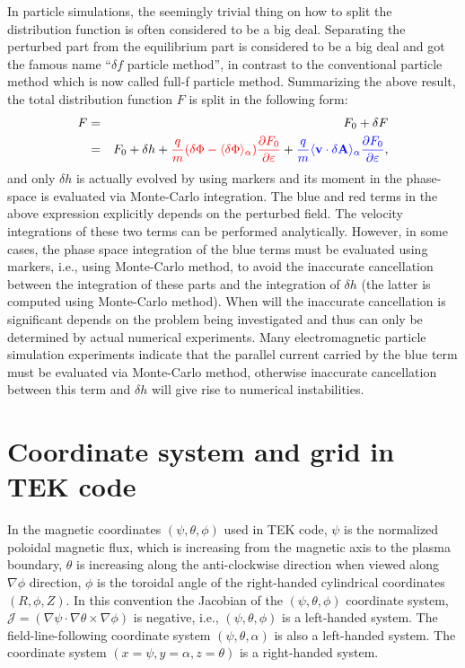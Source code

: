 \documentclass{article}
\newcommand{\tmcolor}[2]{{\color{#1}{#2}}}
\begin{document}
In particle simulations, the seemingly trivial thing on how to split the
distribution function is often considered to be a big deal. Separating the
perturbed part from the equilibrium part is considered to be a big deal and
got the famous name ``$\delta f$ particle method'', in contrast to the
conventional particle method which is now called full-f particle method.
Summarizing the above result, the total distribution function $F$ is split in
the following form:
\begin{eqnarray}
  F & = & F_0 + \delta F \nonumber\\
  & = & F_0 + \delta h + \tmcolor{red}{\frac{q}{m} (\delta \Phi - \langle
  \delta \Phi \rangle_{\alpha}) \frac{\partial F_0}{\partial \varepsilon}} +
  \tmcolor{blue}{\frac{q}{m} \langle \mathbf{v} \cdot \delta \mathbf{A}
  \rangle_{\alpha} \frac{\partial F_0}{\partial \varepsilon}}, 
\end{eqnarray}
and only $\delta h$ is actually evolved by using markers and its moment in the
phase-space is evaluated via Monte-Carlo integration. The blue and red terms
in the above expression explicitly depends on the perturbed field. The
velocity integrations of these two terms can be performed analytically.
However, in some cases, the phase space integration of the blue terms must be
evaluated using markers, i.e., using Monte-Carlo method, to avoid the
inaccurate cancellation between the integration of these parts and the
integration of $\delta h$ (the latter is computed using Monte-Carlo method).
When will the inaccurate cancellation is significant depends on the problem
being investigated and thus can only be determined by actual numerical
experiments. Many electromagnetic particle simulation experiments indicate
that the parallel current carried by the blue term must be evaluated via
Monte-Carlo method, otherwise inaccurate cancellation between this term and
$\delta h$ will give rise to numerical instabilities.

\section{Coordinate system and grid in TEK code}

In the magnetic coordinates $(\psi, \theta, \phi)$ used in TEK code, $\psi$ is
the normalized poloidal magnetic flux, which is increasing from the magnetic
axis to the plasma boundary, $\theta$ is increasing along the anti-clockwise
direction when viewed along $\nabla \phi$ direction, $\phi$ is the toroidal
angle of the right-handed cylindrical coordinates $(R, \phi, Z)$. In this
convention the Jacobian of the $(\psi, \theta, \phi)$ coordinate system,
$\mathcal{J} = (\nabla \psi \cdot \nabla \theta \times \nabla \phi)$ is
negative, i.e., $(\psi, \theta, \phi)$ is a left-handed system. The
field-line-following coordinate system $(\psi, \theta, \alpha)$ is also a
left-handed system. The coordinate system $(x = \psi, y = \alpha, z = \theta)$
is a right-handed system.
\end{document}
